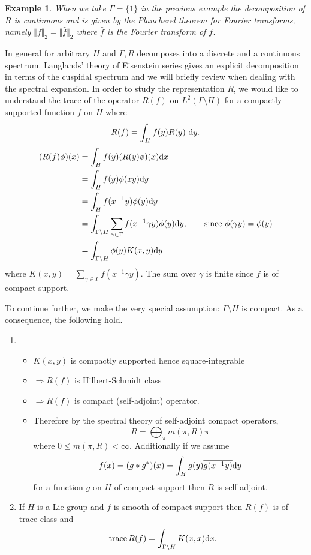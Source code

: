 \documentclass[11pt]{amsart}
\def\d{\text d}
\def\bs{\setminus}
\def\Ltwo{L^2}
\def\norm#1{\Vert #1 \Vert} %
\def\trace{\operatorname{trace}}
\newtheorem{example}[theorem]{Example}
\theoremstyle{remark}
\begin{document}
\begin{example}
	When we take $\Gamma = \{1\}$ in the previous example the decomposition of $R$ is continuous and is given by the Plancherel theorem for Fourier transforms, namely $\norm{f}_2 = \norm{\hat f}_2$ where $\hat f$ is the Fourier transform of $f$. 
\end{example}

In general for arbitrary $H$ and $\Gamma, R$ decomposes into a discrete and a continuous spectrum. Langlands' theory of Eisenstein series gives an explicit decomposition in terms of the cuspidal spectrum and we will briefly review when dealing with the spectral expansion. In order to study the representation $R$, we would like to understand the trace of the operator $R(f)$ on $\Ltwo(\Gamma\bs H)$ for a compactly supported function $f$ on $H$ where
\[ R(f) = \int_H f(y) R(y)\ \d y. \]
\begin{align*}
	(R(f)\phi)(x) & = \int_H f(y) (R(y)\phi)(x) \d x \\
			& = \int_H f(y) \phi(xy) \d y \\
			& = \int_H f(x^{-1} y) \phi(y) \d y \\
			& = \int_{\Gamma\bs H} \sum_{\gamma \in \Gamma} f(x^{-1}\gamma y) \phi(y) \d y, \qquad \text{since } \phi(\gamma y) = \phi(y)\\
			& = \int_{\Gamma\bs H} \phi(y) K(x, y) \d y
\end{align*}
where $K(x, y) = \sum_{\gamma \in \Gamma} f(x^{-1}\gamma y)$. The sum over $\gamma$ is finite since $f$ is of compact support. 

To continue further, we make the very special assumption: $\Gamma\bs H$ is compact. As a consequence, the following hold.
\begin{enumerate}
\item 	\begin{itemize}
		\item[] $K(x, y)$ is compactly supported hence square-integrable
		\item[] $\Rightarrow R(f)$ is Hilbert-Schmidt class
		\item[] $\Rightarrow R(f)$ is compact (self-adjoint) operator. 
		\item[] Therefore by the spectral theory of self-adjoint compact operators,
			\[ R = \bigoplus_\pi m(\pi, R) \pi \]
			where $0 \leq m(\pi, R) < \infty$. Additionally if we assume 
			\[ f(x) = (g*g^*)(x) = \int_H g(y) \overline{g(x^{-1}y)} \d y \]
			for a function $g$ on $H$ of compact support then $R$ is self-adjoint. 
		\end{itemize}
\item If $H$ is a Lie group and $f$ is smooth of compact support then $R(f)$ is of trace class and
	\[ \trace R(f) = \int_{\Gamma\bs H} K(x, x) \d x. \]
\end{enumerate}
\end{document}
